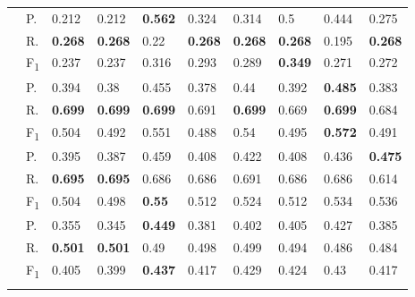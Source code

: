 \begin{tabularx}{\textwidth}{p{1.3em}l Z  Z  Z  Z  Z  Z  Z  Z }
    & P.    & 0.212    & 0.212    & \textbf{ 0.562 }    & 0.324    & 0.314    & 0.5    & 0.444    & 0.275 \\
    & R.    & \textbf{ 0.268 }    & \textbf{ 0.268 }    & 0.22    & \textbf{ 0.268 }    & \textbf{ 0.268 }    & \textbf{ 0.268 }    & 0.195    & \textbf{ 0.268 } \\
    & F\textsubscript{1}    & 0.237    & 0.237    & 0.316    & 0.293    & 0.289    & \textbf{ 0.349 }    & 0.271    & 0.272 \\
     \midrule {}

    & P.    & 0.394    & 0.38    & 0.455    & 0.378    & 0.44    & 0.392    & \textbf{ 0.485 }    & 0.383 \\
    & R.    & \textbf{ 0.699 }    & \textbf{ 0.699 }    & \textbf{ 0.699 }    & 0.691    & \textbf{ 0.699 }    & 0.669    & \textbf{ 0.699 }    & 0.684 \\
    & F\textsubscript{1}    & 0.504    & 0.492    & 0.551    & 0.488    & 0.54    & 0.495    & \textbf{ 0.572 }    & 0.491 \\
     \midrule {}

    & P.    & 0.395    & 0.387    & 0.459    & 0.408    & 0.422    & 0.408    & 0.436    & \textbf{ 0.475 } \\
    & R.    & \textbf{ 0.695 }    & \textbf{ 0.695 }    & 0.686    & 0.686    & 0.691    & 0.686    & 0.686    & 0.614 \\
    & F\textsubscript{1}    & 0.504    & 0.498    & \textbf{ 0.55 }    & 0.512    & 0.524    & 0.512    & 0.534    & 0.536 \\
     \midrule {}

    & P.    & 0.355    & 0.345    & \textbf{ 0.449 }    & 0.381    & 0.402    & 0.405    & 0.427    & 0.385 \\
    & R.    & \textbf{ 0.501 }    & \textbf{ 0.501 }    & 0.49    & 0.498    & 0.499    & 0.494    & 0.486    & 0.484 \\
    & F\textsubscript{1}    & 0.405    & 0.399    & \textbf{ 0.437 }    & 0.417    & 0.429    & 0.424    & 0.43    & 0.417 \\
     \midrule {}

\end{tabularx}